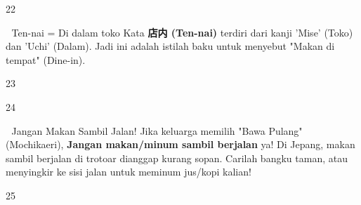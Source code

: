 \begin{convobox}{22}
    \noindent
     

    \vspace{1.5em}
\end{convobox}

\begin{lessonbox}{🏫 Ten-nai = Di dalam toko}
    Kata \textbf{店内 (Ten-nai)} terdiri dari kanji 'Mise' (Toko) dan 'Uchi' (Dalam). Jadi ini adalah istilah baku untuk menyebut "Makan di tempat" (Dine-in).
\end{lessonbox}

\begin{convobox}{23}
    \noindent
      
      
       

    \vspace{1.5em}
\end{convobox}

\begin{convobox}{24}
    \noindent
      
     

    \vspace{1.5em}
\end{convobox}

\begin{lessonbox}{🚫 Jangan Makan Sambil Jalan!}
    Jika keluarga memilih "Bawa Pulang" (Mochikaeri), \textbf{Jangan makan/minum sambil berjalan} ya! Di Jepang, makan sambil berjalan di trotoar dianggap kurang sopan. Carilah bangku taman, atau menyingkir ke sisi jalan untuk meminum jus/kopi kalian!
\end{lessonbox}

\begin{convobox}{25}
    \noindent

    \vspace{1.5em}
\end{convobox}

